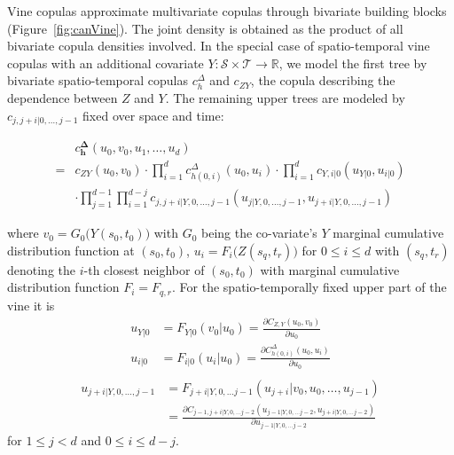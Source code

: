 \documentclass[article,nojss]{jss}
\begin{document}
Vine copulas approximate multivariate copulas through bivariate building blocks (Figure~\ref{fig:canVine}). The joint density is obtained as the product of all bivariate copula densities involved. In the special case of spatio-temporal vine copulas with an additional covariate $Y:\mathcal{S} \times \mathcal{T} \rightarrow \mathbb{R}$, we model the first tree by bivariate spatio-temporal copulas $c_{h}^\Delta$ and $c_{ZY}$, the copula describing the dependence between $Z$ and $Y$. The remaining upper trees are modeled by $c_{j,j+i|0,\dots,j-1}$ fixed over space and time:

\begin{align}\label{eq:spCopCoVDensity}
& c^{\mathbf{\Delta}}_{\mathbf{h}} (u_0, v_0, u_1,\dots,u_{d}) \nonumber \\ 
=& c_{ZY}(u_0,v_0) \cdot \prod\limits_{i=1}^{d} c^\Delta_{h(0,i)}(u_0,u_i) 
\cdot \prod\limits_{i=1}^{d}c_{Y,i|0} (u_{Y|0}, u_{i|0}) \nonumber \\
&\cdot \prod\limits_{j=1}^{d-1}\prod\limits_{i=1}^{d-j}c_{j,j+i|Y,0,\dots,j-1} (u_{j|Y,0,\dots,j-1}, u_{j+i|Y,0,\dots,j-1})
\end{align}

where $v_0 = G_{0}\big(Y(s_0,t_0)\big)$ with $G_{0}$ being the co-variate's $Y$ marginal cumulative distribution function at $(s_0,t_0)$, $u_i = F_i\big(Z(s_q,t_r)\big)$ for $0 \leq i \leq d$ with $(s_q,t_r)$ denoting the $i$-th closest neighbor of $(s_0,t_0)$ with marginal cumulative distribution function $F_i=F_{q,r}$. For the spatio-temporally fixed upper part of the vine it is
\begin{align}
u_{Y|0} &= F_{Y|0}(v_0|u_0) = \frac{\partial C_{Z,Y}(u_0,v_0)}{\partial u_0}\nonumber \\
u_{i|0} &= F_{i|0}(u_i|u_0) = \frac{\partial C_{h(0,i)}^\Delta(u_0,u_i)}{\partial u_0}\label{eq:pseudoObs}\\
\end{align}
\begin{align*}
u_{j+i|Y,0,\dots, j-1} &= F_{j+i|Y,0,\dots j-1}(u_{j+i}|v_0,u_0,\dots, u_{j-1})\\
	&=\frac{\partial C_{j-1,j+i|Y,0,\dots j-2}(u_{j-1|Y,0,\dots j-2},u_{j+i|Y,0,\dots j-2})}{\partial u_{j-1|Y,0,\dots j-2}}
\end{align*}
for $1 \leq j < d$ and $0 \leq i \leq d-j$.
\end{document}
